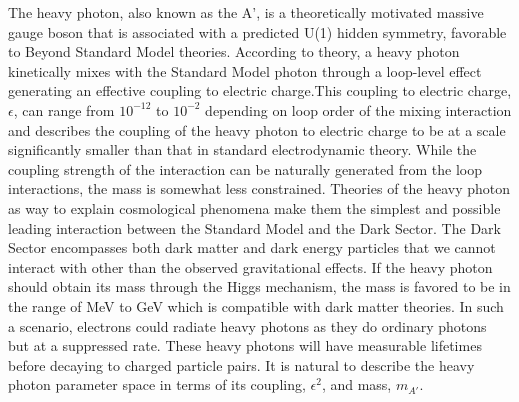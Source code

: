 The heavy photon, also known as the A', is a theoretically motivated massive gauge boson that is associated with a predicted U(1) hidden symmetry, favorable to Beyond Standard Model theories. According to theory, a heavy photon kinetically mixes with the Standard Model photon through a loop-level effect generating an effective coupling to electric charge.This coupling to electric charge, $\epsilon$, can range from $10^{-12}$ to $10^{-2}$ depending on loop order of the mixing interaction and describes the coupling of the heavy photon to electric charge to be at a scale significantly smaller than that in standard electrodynamic theory. While the coupling strength of the interaction can be naturally generated from the loop interactions, the mass is somewhat less constrained. Theories of the heavy photon as way to explain cosmological phenomena make them the simplest and possible leading interaction between the Standard Model and the Dark Sector. The Dark Sector encompasses both dark matter and dark energy particles that we cannot interact with other than the observed gravitational effects. If the heavy photon should obtain its mass through the Higgs mechanism, the mass is favored to be in the range of MeV to GeV which is compatible with dark matter theories. In such a scenario, electrons could radiate heavy photons as they do ordinary photons but at a suppressed rate. These heavy photons will have measurable lifetimes before decaying to charged particle pairs. It is natural to describe the heavy photon parameter space in terms of its coupling, $\epsilon^2$, and mass, $m_{A'}$. \\
